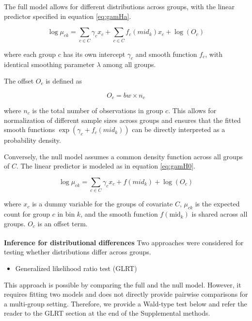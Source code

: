 The full model allows for different distributions across groups, with the linear predictor specified in equation \ref{eq:gamHa}.

\begin{equation}
    \log \mu_{ck} = \sum_{c \in C}\gamma_cx_c + \sum_{c \in C} f_c(mid_k)x_c + \log(O_c)
    \label{eq:gamHa}
\end{equation}

where each group $c$ has its own intercept $\gamma_c$ and smooth function $f_c$, with identical smoothing parameter $\lambda$ among all groups.

The offset $O_c$ is defined as

\begin{equation}
    O_c = bw \times n_c
    \label{eq:offset}
\end{equation}

where $n_c$ is the total number of observations in group $c$. This allows for normalization of different sample sizes across groups and ensures that the fitted smooth functions $\exp(\gamma_c + f_c(mid_k))$ can be directly interpreted as a probability density.

Conversely, the null model assumes a common density function across all groups of $C$. The linear predictor is modeled as in equation \ref{eq:gamH0}.

\begin{equation}
    \log \mu_{ck} = \sum_{c \in C}\gamma_cx_c + f(mid_k) + \log(O_c)
    \label{eq:gamH0}
\end{equation}

where $x_c$ is a dummy variable for the groups of covariate $C$, $\mu_{ck}$ is the expected count for group $c$ in bin $k$, and the smooth function $f(\text{mid}_k)$ is shared across all groups. $O_c$ is an offset term.
\\
\\
\textbf{Inference for distributional differences}
Two approaches were considered for testing whether distributions differ across groups.

\begin{itemize}
    \item Generalized likelihood ratio test (GLRT)
\end{itemize}
This approach is possible by comparing the full and the null model. However, it requires fitting two models and does not directly provide pairwise comparisons for a multi-group setting. Therefore, we provide a Wald-type test below and refer the reader to the GLRT section at the end of the Supplemental methods.

